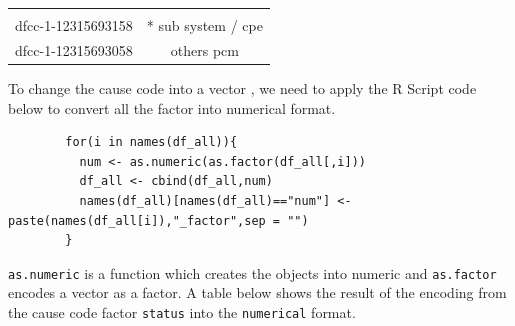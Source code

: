 \documentclass[]{article}
\begin{document}
\begin{longtable}[c]{@{}cc@{}}
\begin{minipage}[t]{0.39\columnwidth}
\strut\end{minipage}\tabularnewline
\begin{minipage}[t]{0.25\columnwidth}\centering\strut
dfcc-1-12315693158
\strut\end{minipage} &
\begin{minipage}[t]{0.39\columnwidth}\centering\strut
* sub system / cpe
\strut\end{minipage}\tabularnewline
\begin{minipage}[t]{0.25\columnwidth}\centering\strut
dfcc-1-12315693058
\strut\end{minipage} &
\begin{minipage}[t]{0.39\columnwidth}\centering\strut
others pcm
\strut\end{minipage}\tabularnewline
\bottomrule
\end{longtable}

To change the cause code into a vector , we need to apply the R Script
code below to convert all the factor into numerical format.

\begin{verbatim}
        for(i in names(df_all)){
          num <- as.numeric(as.factor(df_all[,i]))
          df_all <- cbind(df_all,num)
          names(df_all)[names(df_all)=="num"] <- paste(names(df_all[i]),"_factor",sep = "")
        }
\end{verbatim}

\texttt{as.numeric} is a function which creates the objects into numeric
and \texttt{as.factor} encodes a vector as a factor. A table below shows
the result of the encoding from the cause code factor \texttt{status}
into the \texttt{numerical} format.
\end{document}
